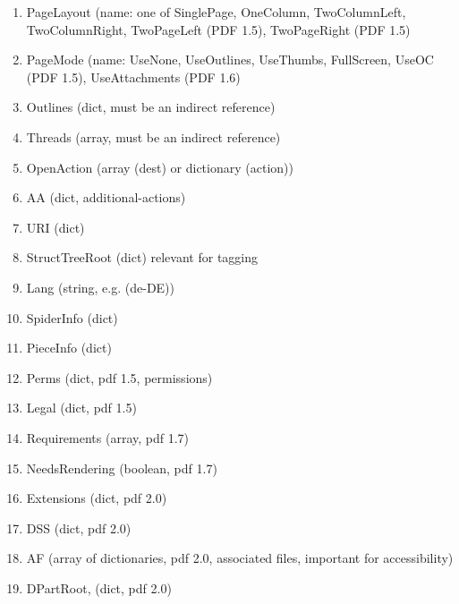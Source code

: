 \documentclass{article}
\begin{document}
\begin{itemize}
\begin{enumerate}
  \item PageLayout (name: one of SinglePage, OneColumn, 
  TwoColumnLeft, TwoColumnRight, TwoPageLeft (PDF 1.5), TwoPageRight (PDF 1.5) 
  \item PageMode (name: UseNone, UseOutlines, UseThumbs, FullScreen, UseOC (PDF 1.5),
   UseAttachments (PDF 1.6)

  \item Outlines (dict, must be an indirect reference) 
  \item Threads (array, must be an indirect reference) 
  \item OpenAction (array (dest) or dictionary (action))
  \item AA (dict, additional-actions) 
  \item URI (dict) 
  \item StructTreeRoot (dict) relevant for tagging
 
   \item Lang (string, e.g. (de-DE))
  \item SpiderInfo (dict) 
  \item PieceInfo (dict) 
 
  \item Perms (dict, pdf 1.5, permissions) 
  \item Legal (dict, pdf 1.5)
  \item Requirements (array, pdf 1.7) 

  \item NeedsRendering (boolean, pdf 1.7) 
  \item Extensions (dict, pdf 2.0)
  \item DSS (dict, pdf 2.0)
  \item AF (array of dictionaries, pdf 2.0, associated files, important for accessibility)
  \item DPartRoot, (dict, pdf 2.0)
\end{enumerate}
\end{itemize}
\end{document}
